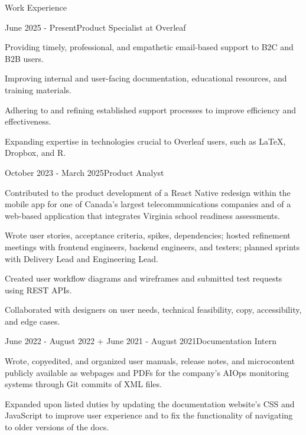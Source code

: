 \documentclass[11pt]{resume} %
\begin{document}
\begin{rSection}{\large Work Experience}

	\begin{rSubsection}{\underline{}}{June 2025 - Present}{Product Specialist at Overleaf}{}\small
		\item Providing timely, professional, and empathetic email-based support to B2C and B2B users.
		\item Improving internal and user-facing documentation, educational resources, and training materials.
		\item Adhering to and refining established support processes to improve efficiency and effectiveness.
		\item Expanding expertise in technologies crucial to Overleaf users, such as \LaTeX, Dropbox, and R.
	\end{rSubsection}


	\begin{rSubsection}{\underline{}}{October 2023 - March 2025}{Product Analyst}{}\small
		\item Contributed to the product development of a React Native redesign within the mobile app for one of Canada’s largest telecommunications companies and of a web-based application that integrates Virginia school readiness assessments.
		\item Wrote user stories, acceptance criteria, spikes, dependencies; hosted refinement meetings with frontend engineers, backend engineers, and testers; planned sprints with Delivery Lead and Engineering Lead.
		\item Created user workflow diagrams and wireframes and submitted test requests using REST APIs.
            \item Collaborated with designers on user needs, technical feasibility, copy, accessibility, and edge cases.
	\end{rSubsection}


	\begin{rSubsection}{\underline{}}{June 2022 - August 2022 + June 2021 - August 2021}{Documentation Intern}{}\small
		\item Wrote, copyedited, and organized user manuals, release notes, and microcontent publicly available as webpages and PDFs for the company's AIOps monitoring systems through Git commits of XML files.
		\item Expanded upon listed duties by updating the documentation website’s CSS and JavaScript to improve user experience and to fix the functionality of navigating to older versions of the docs.
	\end{rSubsection}


\end{rSection}
\end{document}
